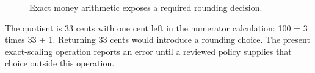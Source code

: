 \begin{figure}[H]
\centering
{}
\caption{Exact money arithmetic exposes a required rounding decision.}\label{fig:teach-M07-02}
\end{figure}

The quotient is 33 cents with one cent left in the numerator calculation: 100 = 3 times 33 + 1. Returning 33 cents would introduce a rounding choice. The present exact-scaling operation reports an error until a reviewed policy supplies that choice outside this operation.

